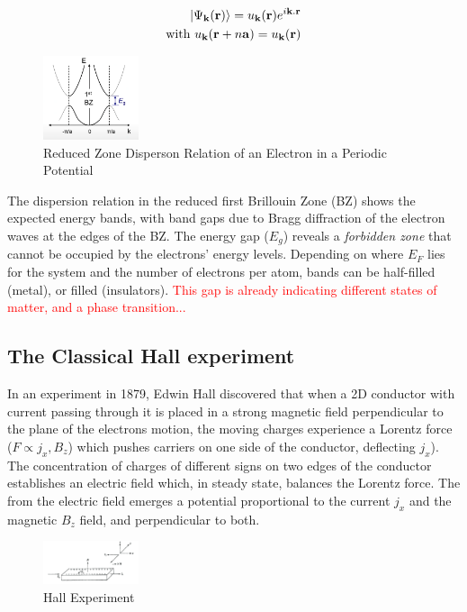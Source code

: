 \begin{align}
    \ket{\Psi_{\mathbf{k}}(\mathbf{r})} = u_{\mathbf{k}}(\mathbf{r})e^{i\mathbf{k.r}} \\
    \text{with } u_{\mathbf{k}}(\mathbf{r} + n\mathbf{a}) = u_{\mathbf{k}}(\mathbf{r}) 
\end{align}

\begin{figure}[thpb]
    \centering
    \includegraphics[width=0.25\textwidth]{figs/nfe-ek.png}
    \caption{\label{fig:ek-nfe}Reduced Zone Disperson Relation of an Electron in a Periodic Potential}
    \end{figure}

The dispersion relation in the reduced first Brillouin Zone (BZ) shows the expected energy bands, with band gaps due to Bragg diffraction of the electron waves at the edges of the BZ. The energy gap ($E_{g}$) reveals a \textit{forbidden zone} that cannot be occupied by the electrons' energy levels. Depending on where $E_{F}$ lies for the system and the number of electrons per atom, bands can be half-filled (metal), or filled (insulators). \textcolor{red}{This gap is already indicating different states of matter, and a phase transition...}

\subsection*{\label{ssec:classic-hall}The Classical Hall experiment}
In an experiment in 1879, Edwin Hall discovered that when a 2D conductor with current passing through it is placed in a strong magnetic field perpendicular to the plane of the electrons motion, the moving charges experience a Lorentz force ($F \propto j_{x}, B_{z}$) which pushes carriers on one side of the conductor, deflecting $j_{x}$). The concentration of charges of different signs on two edges of the conductor establishes an electric field which, in steady state, balances the Lorentz force. The from the electric field emerges a potential proportional to the current $j_{x}$ and the magnetic $B_{z}$ field, and perpendicular to both. 

\begin{figure}[thpb]
    \centering
    \includegraphics[width=0.25\textwidth]{figs/Hall.png}
    \caption{\label{fig:hall}Hall Experiment}
    \end{figure}

